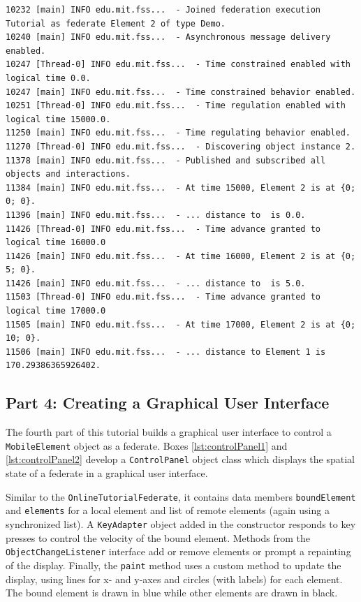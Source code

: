\documentclass[]{article}
\begin{document}
\begin{Code}
\begin{lstlisting}[caption={Element2 partial main output},label={lst:part3Output2},numbers=none]
10232 [main] INFO edu.mit.fss...  - Joined federation execution Tutorial as federate Element 2 of type Demo.
10240 [main] INFO edu.mit.fss...  - Asynchronous message delivery enabled.
10247 [Thread-0] INFO edu.mit.fss...  - Time constrained enabled with logical time 0.0.
10247 [main] INFO edu.mit.fss...  - Time constrained behavior enabled.
10251 [Thread-0] INFO edu.mit.fss...  - Time regulation enabled with logical time 15000.0.
11250 [main] INFO edu.mit.fss...  - Time regulating behavior enabled.
11270 [Thread-0] INFO edu.mit.fss...  - Discovering object instance 2.
11378 [main] INFO edu.mit.fss...  - Published and subscribed all objects and interactions.
11384 [main] INFO edu.mit.fss...  - At time 15000, Element 2 is at {0; 0; 0}.
11396 [main] INFO edu.mit.fss...  - ... distance to  is 0.0.
11426 [Thread-0] INFO edu.mit.fss...  - Time advance granted to logical time 16000.0
11426 [main] INFO edu.mit.fss...  - At time 16000, Element 2 is at {0; 5; 0}.
11426 [main] INFO edu.mit.fss...  - ... distance to  is 5.0.
11503 [Thread-0] INFO edu.mit.fss...  - Time advance granted to logical time 17000.0
11505 [main] INFO edu.mit.fss...  - At time 17000, Element 2 is at {0; 10; 0}.
11506 [main] INFO edu.mit.fss...  - ... distance to Element 1 is 170.29386365926402.
\end{lstlisting}
\end{Code}

\subsection{Part 4: Creating a Graphical User Interface}

The fourth part of this tutorial builds a graphical user interface to control a \texttt{MobileElement} object as a federate. Boxes \ref{lst:controlPanel1} and \ref{lst:controlPanel2} develop a \texttt{ControlPanel} object class which displays the spatial state of a federate in a graphical user interface.

Similar to the \texttt{OnlineTutorialFederate}, it contains data members \texttt{boundElement} and \texttt{elements} for a local element and list of remote elements (again using a synchronized list). A \texttt{KeyAdapter} object added in the constructor responds to key presses to control the velocity of the bound element. Methods from the \texttt{ObjectChangeListener} interface add or remove elements or prompt a repainting of the display. Finally, the \texttt{paint} method uses a custom method to update the display, using lines for x- and y-axes and circles (with labels) for each element. The bound element is drawn in blue while other elements are drawn in black.
\end{document}
